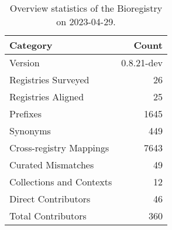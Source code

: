 \begin{table}
\caption{Overview statistics of the Bioregistry on 2023-04-29.}
\label{tab:bioregistry-summary}
\begin{tabular}{lr}
\toprule
Category & Count \\
\midrule
Version & 0.8.21-dev \\
Registries Surveyed & 26 \\
Registries Aligned & 25 \\
Prefixes & 1645 \\
Synonyms & 449 \\
Cross-registry Mappings & 7643 \\
Curated Mismatches & 49 \\
Collections and Contexts & 12 \\
Direct Contributors & 46 \\
Total Contributors & 360 \\
\bottomrule
\end{tabular}
\end{table}
